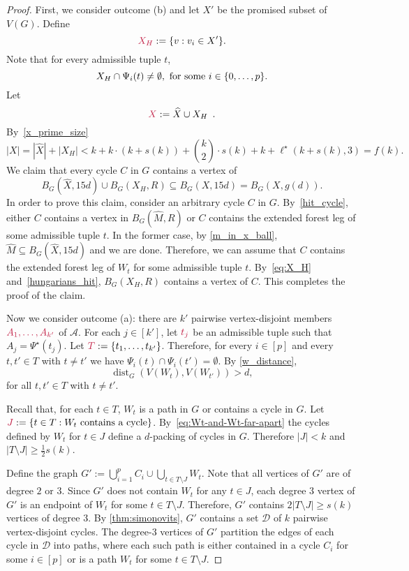 \documentclass{patmorin}
\DeclareMathOperator{\dist}{dist}
\DeclarePairedDelimiter\set{\{}{\}}
\begin{document}
\begin{proof}
First, we consider outcome (b) and let $X'$ be the promised subset of $V(G)$.
Define 
\[
\mathdefin{X_H}:=\set{v:v_i\in X'}.
\]
Note that 
for every admissible tuple $t$,
\begin{equation}\label{eq:X_H}
X_H \cap \Psi_i(t) \neq\emptyset,\ \textrm{for some $i\in\set{0,\ldots,p}$.}
\end{equation}
Let
\[
\mathdefin{X}:=\widehat{X} \cup X_H \enspace .
\]
By~\eqref{x_prime_size}
\[
|X| = |\widehat{X}| + |X_H| < \textstyle k + k\cdot (k+s(k)) + \binom{k}{2}\cdot s(k) + k + \ell^\star(k+s(k),3) = f(k).
\]
We claim that every cycle $C$ in $G$ contains a vertex of 
\[
B_G(\widehat{X},15d)\cup B_G(X_H,R)\subseteq B_G(X,15d) = B_G(X,g(d)).
\]
In order to prove this claim, consider an arbitrary cycle $C$ in $G$. 
By~\cref{hit_cycle}, either $C$ contains a vertex in $B_G(\widehat{M},R)$ or $C$ contains the extended forest leg of some admissible tuple $t$. 
In the former case, by \eqref{m_in_x_ball}, $\widehat{M}\subseteq B_G(\widehat{X},15d)$ and we are done. 
Therefore, we can assume that $C$ contains the extended forest leg of $W_t$ for some admissible tuple $t$. 
By~\eqref{eq:X_H} and~\cref{hungarians_hit}, 
$B_G(X_H,R)$ contains a vertex of $C$.
This completes the proof of the claim.

Now we consider outcome (a): 
there are $k'$ pairwise vertex-disjoint members $\mathdefin{A_1,\ldots,A_{k'}}$ of $\mathcal{A}$. 
For each $j\in[k']$, let $\mathdefin{t_j}$ be an admissible tuple such that $A_j = \Psi^\star(t_j)$. 
Let $\mathdefin{T}:=\set{t_1,\ldots, t_{k'}}$. 
Therefore, for every $i\in[p]$ and every $t,t'\in T$ with $t\neq t'$ we have $\Psi_i(t) \cap \Psi_i(t') = \emptyset$. 
By \cref{w_distance}, 
\begin{equation}\label{eq:Wt-and-Wt-far-apart}
\dist_G(V(W_{t}), V(W_{t'}))> d, 
\end{equation}
for all $t,t'\in T$ with $t\neq t'$. 

Recall that, for each $t\in T$, $W_t$ is a path in $G$ or contains a cycle in $G$. 
Let $\mathdefin{J}:=\{t\in T:\text{$W_t$ contains a cycle}\}$.  By~\eqref{eq:Wt-and-Wt-far-apart} the cycles defined by $W_t$ for $t\in J$ define a $d$-packing of cycles in $G$.  Therefore $|J|<k$ and $|T\setminus J|\geq \tfrac{1}{2}s(k)$.

Define the graph $G':=\bigcup_{i=1}^p C_i\cup \bigcup_{t\in T\setminus J} W_{t}$.  
Note that all vertices of $G'$ are of degree $2$ or $3$.  Since $G'$ does not contain $W_t$ for any $t\in J$, each degree $3$ vertex of $G'$ is an endpoint of $W_{t}$ for some $t\in T\setminus J$. 
Therefore, $G'$ contains $2|T\setminus J|\geq s(k)$ vertices of degree $3$.
By \cref{thm:simonovits}, $G'$ contains a set $\mathcal{D}$ of $k$ pairwise vertex-disjoint cycles.  The degree-$3$ vertices of $G'$ partition the edges of each cycle in $\mathcal{D}$ into paths, where each such path is either contained in a cycle $C_i$ for some $i\in[p]$ or is a path $W_t$ for some $t\in T\setminus J$.  


\end{proof}
\end{document}
